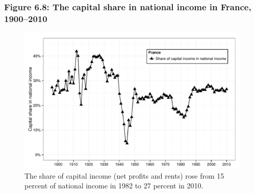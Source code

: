 \documentclass[t]{beamer}\usepackage[]{graphicx}\usepackage[]{color}
\newenvironment{knitrout}{}{} %
\begin{document}
\begin{frame}[label=Figure_6_8]
\frametitle{Figure 6.8: The capital share in national income in France, 1900--2010}
\begin{figure}[t]
\begin{minipage}[b]{\textwidth}
\centering
\begin{knitrout}\footnotesize
{}\color{fgcolor}

{\centering \includegraphics[width=1\linewidth]{figures/bw/Figure_6_8} 

}



\end{knitrout}
\caption{The share of capital income (net profits and rents) rose from 15 percent of national income in 1982 to 27 percent in 2010.}
\end{minipage}
\end{figure}
\end{frame}
\end{document}
